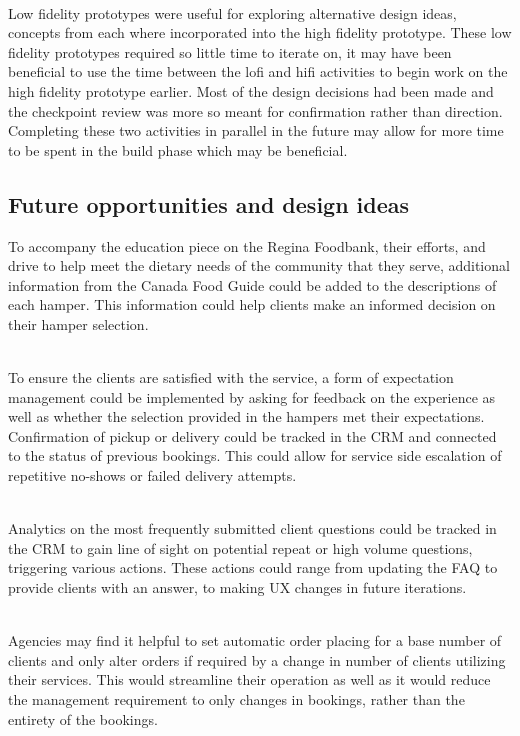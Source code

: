 \documentclass[english,course]{lecture}
\begin{document}
\\Low fidelity prototypes were useful for exploring alternative design ideas, concepts from each where incorporated into the high fidelity prototype. These low fidelity prototypes required so little time to iterate on, it may have been beneficial to use the time between the lofi and hifi activities to begin work on the high fidelity prototype earlier. Most of the design decisions had been made and the checkpoint review was more so meant for confirmation rather than direction. Completing these two activities in parallel in the future may allow for more time to be spent in the build phase which may be beneficial.

\subsection{Future opportunities and design ideas}
To accompany the education piece on the Regina Foodbank, their efforts, and drive to help meet the dietary needs of the community that they serve, additional information from the Canada Food Guide could be added to the descriptions of each hamper. This information could help clients make an informed decision on their hamper selection.

\\To ensure the clients are satisfied with the service, a form of expectation management could be implemented by asking for feedback on the experience as well as whether the selection provided in the hampers met their expectations. Confirmation of pickup or delivery could be tracked in the CRM and connected to the status of previous bookings. This could allow for service side escalation of repetitive no-shows or failed delivery attempts.

\\Analytics on the most frequently submitted client questions could be tracked in the CRM to gain line of sight on potential repeat or high volume questions, triggering various actions. These actions could range from updating the FAQ to provide clients with an answer, to making UX changes in future iterations.

\\Agencies may find it helpful to set automatic order placing for a base number of clients and only alter orders if required by a change in number of clients utilizing their services. This would streamline their operation as well as it would reduce the management requirement to only changes in bookings, rather than the entirety of the bookings.
\end{document}
